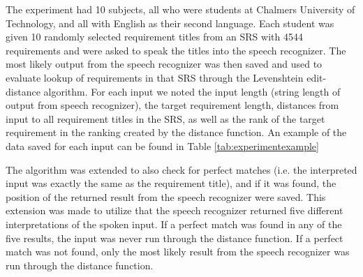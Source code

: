 \documentclass[conference]{IEEEtran}
\begin{document}
The experiment had 10 subjects, all who were students at Chalmers University of Technology, and all with English as their second language. 
Each student was given 10 randomly selected requirement titles from an SRS with 4544 requirements and were asked to speak the titles into the speech recognizer. 
The most likely output from the speech recognizer was then saved and used to evaluate lookup of requirements in that SRS through the Levenshtein edit-distance algorithm.
For each input we noted the input length (string length of output from speech recognizer), the target requirement length, distances from input to all requirement titles in the SRS, as well as the rank of the target requirement in the ranking created by the distance function.
An example of the data saved for each input can be found in Table \ref{tab:experimentexample} 

The algorithm was extended to also check for perfect matches (i.e. the interpreted input was exactly the same as the requirement title), and if it was found, the position of the returned result from the speech recognizer were saved. This extension was made to utilize that the speech recognizer returned five different interpretations of the spoken input. If a perfect match was found in any of the five results, the input was never run through the distance function. If a perfect match was not found, only the most likely result from the speech recognizer was run through the distance function. 

\end{document}
